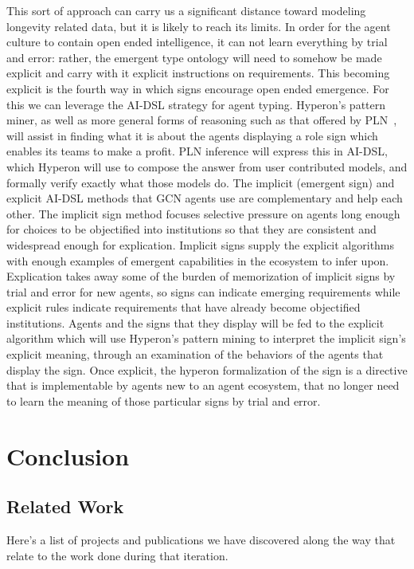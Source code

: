 \documentclass[]{report}
\begin{document}
This sort of approach can carry us a significant distance toward
modeling longevity related data, but it is likely to reach its
limits. In order for the agent culture to contain open ended
intelligence, it can not learn everything by trial and error: rather,
the emergent type ontology will need to somehow be made explicit and
carry with it explicit instructions on requirements. This becoming
explicit is the fourth way in which signs encourage open ended
emergence. For this we can leverage the AI-DSL strategy for agent
typing.  Hyperon’s pattern miner, as well as more general forms of
reasoning such as that offered by PLN~\cite{Goertzel09PLN}, will
assist in finding what it is about the agents displaying a role sign
which enables its teams to make a profit.  PLN inference will express
this in AI-DSL, which Hyperon will use to compose the answer from user
contributed models, and formally verify exactly what those models do.
The implicit (emergent sign) and explicit AI-DSL methods that GCN
agents use are complementary and help each other. The implicit sign
method focuses selective pressure on agents long enough for choices to
be objectified into institutions so that they are consistent and
widespread enough for explication. Implicit signs supply the explicit
algorithms with enough examples of emergent capabilities in the
ecosystem to infer upon. Explication takes away some of the burden of
memorization of implicit signs by trial and error for new agents, so
signs can indicate emerging requirements while explicit rules indicate
requirements that have already become objectified institutions. Agents
and the signs that they display will be fed to the explicit algorithm
which will use Hyperon's pattern mining to interpret the implicit
sign's explicit meaning, through an examination of the behaviors of
the agents that display the sign. Once explicit, the hyperon
formalization of the sign is a directive that is implementable by
agents new to an agent ecosystem, that no longer need to learn the
meaning of those particular signs by trial and error.

\chapter{Conclusion}

\section{Related Work}
\label{sec:related_work}

Here's a list of projects and publications we have discovered along
the way that relate to the work done during that iteration.
\end{document}

